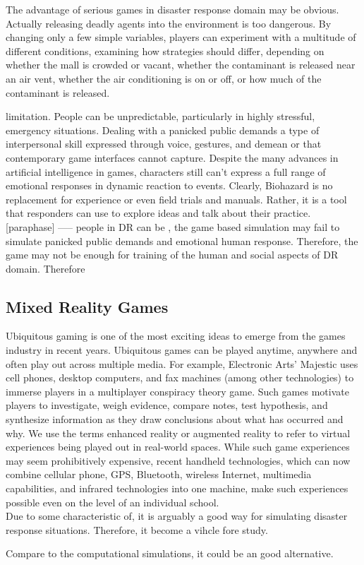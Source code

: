 The advantage of serious games in disaster response domain may be obvious.  Actually
releasing deadly agents into the environment is too dangerous. By changing only a few
simple variables, players can experiment with a multitude of different conditions,
examining how strategies should differ, depending on whether the mall is crowded or
vacant, whether the contaminant is released near an air vent, whether the air
conditioning is on or off, or how much of the contaminant is released. 


limitation. People can be unpredictable, particularly in highly stressful, emergency situations. Dealing with a panicked public demands a type of interpersonal skill expressed through voice, gestures, and demean or that contemporary game interfaces cannot capture. Despite the many advances in artificial intelligence in games, characters still can't express a full range of emotional responses in dynamic reaction to events. Clearly, Biohazard is no replacement for experience or even field trials and manuals. Rather, it is a tool that responders can use to explore ideas and talk about their practice. [paraphase] ----- people in DR can be , the game based simulation may fail to simulate panicked public demands and emotional human response. Therefore, the game may not be enough for training of  the human and social aspects of DR domain. Therefore



\subsection{Mixed Reality Games}

Ubiquitous gaming is one of the most exciting ideas to emerge from the games industry in recent years. Ubiquitous games can be played anytime, anywhere and often play out across multiple media. For example, Electronic Arts' Majestic uses cell phones, desktop computers, and fax machines (among other technologies) to immerse players in a multiplayer conspiracy theory game. Such games motivate players to investigate, weigh evidence, compare notes, test hypothesis, and synthesize information as they draw conclusions about what has occurred and why. We use the terms enhanced reality or augmented reality to refer to virtual experiences being played out in real-world spaces. While such game experiences may seem prohibitively expensive, recent handheld technologies, which can now combine cellular phone, GPS, Bluetooth, wireless Internet, multimedia capabilities, and infrared technologies into one machine, make such experiences possible even on the level of an individual school.\\


Due to some characteristic of, it is arguably a good way for simulating disaster response situations. Therefore, it become a vihcle fore study.



Compare to the computational simulations, it could be an good alternative. \\

